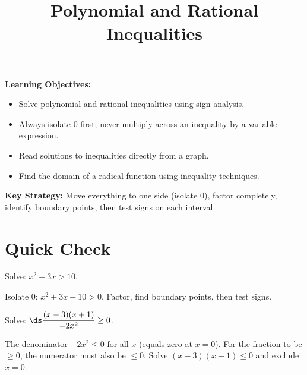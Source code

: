 \documentclass{ximera}
\title{Polynomial and Rational Inequalities}
\begin{document}
\begin{abstract}
\end{abstract}
\maketitle

\textbf{Learning Objectives:}
\begin{itemize}
  \item Solve polynomial and rational inequalities using sign analysis.
  \item Always isolate 0 first; never multiply across an inequality by a variable expression.
  \item Read solutions to inequalities directly from a graph.
  \item Find the domain of a radical function using inequality techniques.
\end{itemize}
\medskip

\noindent\textbf{Key Strategy:} Move everything to one side (isolate 0), factor completely, identify boundary points, then test signs on each interval.

\bigskip
\section*{Quick Check}

\begin{problem}
Solve: $x^2+3x > 10$.
\begin{hint}
Isolate 0: $x^2+3x-10 > 0$. Factor, find boundary points, then test signs.
\end{hint}
\begin{multipleChoice}
\end{multipleChoice}
\end{problem}

\begin{problem}
Solve: $\ds\dfrac{(x-3)(x+1)}{-2x^2}\geq 0$.
\begin{hint}
The denominator $-2x^2 \leq 0$ for all $x$ (equals zero at $x=0$). For the fraction to be $\geq 0$, the numerator must also be $\leq 0$. Solve $(x-3)(x+1)\leq 0$ and exclude $x=0$.
\end{hint}
\begin{multipleChoice}
  \choice{$[-1,3]$}
  \choice{$(-\infty,-1]\cup[3,\infty)$}
  \choice{$(-\infty,-1)\cup(0,3]$}
  \choice[correct]{$[-1,0)\cup(0,3]$}
\end{multipleChoice}
\end{problem}
\end{document}
